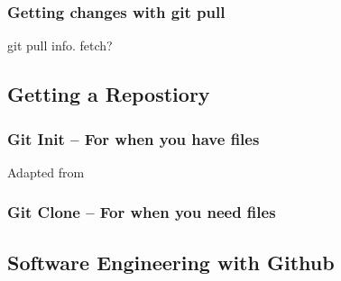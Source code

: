 \documentclass{beamer}
\begin{document}
\begin{frame}
\frametitle{Getting changes with git pull}
git pull info.  fetch?
\end{frame}

\subsection[Getting a Repository]{Getting a Repostiory}

\begin{frame}
\frametitle{Git Init -- For when you have files}
Adapted from \cite{github-help}
\begin{enumerate}
\end{enumerate}
\end{frame}

\begin{frame}
\frametitle{Git Clone -- For when you need files}
\begin{enumerate}
\end{enumerate}
\end{frame}

\subsection[Github]{Software Engineering with Github}
\end{document}

